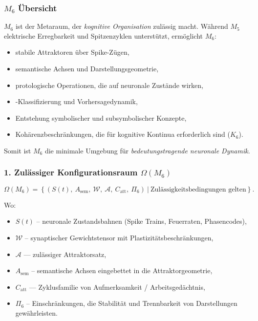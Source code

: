 

\subsubsection{\texorpdfstring{$M_6$}{M_6} Übersicht}
\label{sec:m6-overview}

$M_6$ ist der Metaraum, der \emph{kognitive Organisation} zulässig macht.
Während $M_5$ elektrische Erregbarkeit und Spitzenzyklen unterstützt, ermöglicht $M_6$:

\begin{itemize}
    \item stabile Attraktoren über Spike-Zügen,
    \item semantische Achsen und Darstellungsgeometrie,
    \item protologische Operationen, die auf neuronale Zustände wirken,
    \item-Klassifizierung und Vorhersagedynamik,
    \item Entstehung symbolischer und subsymbolischer Konzepte,
    \item Kohärenzbeschränkungen, die für kognitive Kontinua erforderlich sind ($K_6$).
\end{itemize}

Somit ist $M_6$ die minimale Umgebung für \emph{bedeutungstragende neuronale Dynamik}.

\subsubsection*{1. Zulässiger Konfigurationsraum \texorpdfstring{$\Omega(M_6)$}{\Omega(M_6)}}

\[
\Omega(M_6) =
\left\{
(S(t),\ A_{\mathrm{sem}},\
\mathcal{W},\
\mathcal{A},\
C_{\mathrm{att}},\
\Pi_6)
\ \big|\ \text{Zulässigkeitsbedingungen gelten}
\right\}.
\]

Wo:

\begin{itemize}
    \item $S(t)$ – neuronale Zustandsbahnen (Spike Trains, Feuerraten, Phasencodes),
    \item $\mathcal{W}$ – synaptischer Gewichtstensor mit Plastizitätsbeschränkungen,
    \item $\mathcal{A}$ — zulässiger Attraktorsatz,
    \item $A_{\mathrm{sem}}$ – semantische Achsen eingebettet in die Attraktorgeometrie,
    \item $C_{\mathrm{att}}$ — Zyklusfamilie von Aufmerksamkeit / Arbeitsgedächtnis,
    \item $\Pi_6$ – Einschränkungen, die Stabilität und Trennbarkeit von Darstellungen gewährleisten.
\end{itemize}

